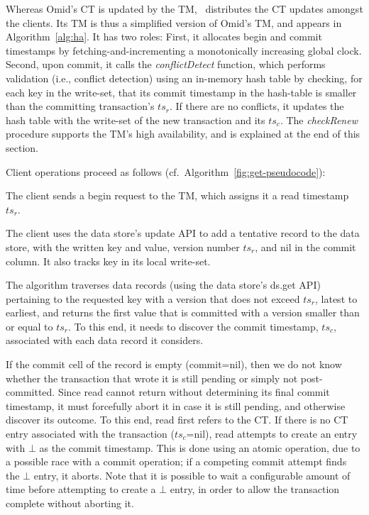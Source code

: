 Whereas Omid's CT is updated by the TM, \sysll\ distributes the CT updates amongst the clients.
Its TM is thus a simplified version of Omid's TM, and appears  in Algorithm~\ref{alg:ha}. It has two roles:
First, it allocates begin and commit timestamps by fetching-and-incrementing a monotonically increasing global clock.
Second, upon commit, it calls the \emph{conflictDetect} function, which 
performs validation (i.e., conflict detection) using an in-memory hash table
by checking, for each key in the write-set, that its commit timestamp in the hash-table is smaller than the 
committing transaction's $ts_r$. If there are no conflicts, it 
updates the hash table with the write-set of the new transaction and its $ts_c$. 
The  \emph{checkRenew} procedure supports the TM's  high availability, and is explained at the end of this section.



\noindent
Client operations proceed as follows (cf.~Algorithm~\ref{fig:get-pseudocode}):

The client sends a begin request to the TM, which assigns it a read timestamp $ts_r$.

The client uses the data store's update API to add a tentative record to the data store, with the written key and value, 
version number $ts_r$, and nil in the commit column.
It also tracks key in its local write-set.

The algorithm traverses data  records (using the data store's ds.get API) pertaining
to the requested key with a version that does not exceed $ts_r$, latest to earliest, and returns the first value that is committed
with a  version smaller than or equal to $ts_r$. To this end, it needs to discover the commit timestamp, $ts_c$, associated with
each data record it considers. 

If the commit cell of the record is empty (commit=nil), then we do not know whether the transaction that wrote it is still pending 
or simply not post-committed. Since read cannot return without determining its final commit timestamp, 
it must forcefully abort it in case it is still pending, and otherwise discover its outcome.
To this end, read first refers to the CT.
If there is no CT entry associated with the transaction ($ts_c$=nil), 
read attempts to create an entry with $\bot$ as the commit timestamp. 
This is done using an atomic  operation, due to a possible 
race with a commit operation; if a competing commit attempt finds the   $\bot$ entry, it  aborts. 
Note that it is possible  to wait a configurable amount of time before attempting to create a $\bot$ entry, in
order to allow the transaction complete without aborting it.

